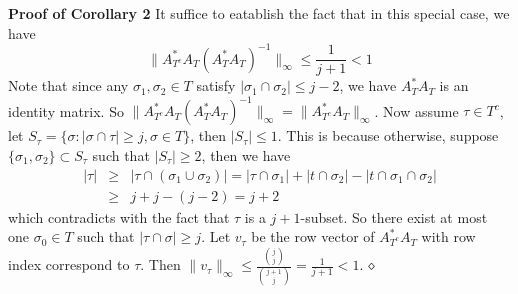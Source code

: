 \documentclass{article}
\begin{document}
\textbf{Proof of Corollary 2} 
It suffice to eatablish the fact that in this special case, we have
$$\|A^*_{T^c}A_T(A^*_TA_T)^{-1}\|_\infty\le \frac{1}{j+1}<1$$
Note that since any $\sigma_1, \sigma_2\in T$ satisfy $|\sigma_1\cap\sigma_2|\le j-2$, 
we have $A^*_TA_T$ is an identity matrix. 
So $\|A^*_{T^c}A_T(A^*_TA_T)^{-1}\|_\infty=\|A^*_{T^c}A_T\|_\infty$. 
Now assume $\tau\in T^c$, let $S_{\tau}=\{\sigma: |\sigma\cap \tau|\ge j, \sigma\in T\}$, 
then $|S_{\tau}|\le 1$. This is because otherwise, suppose 
$\{\sigma_1,\sigma_2\}\subset S_{\tau}$ such that $|S_{\tau}|\ge 2$, then we have
\begin{eqnarray*}
|\tau|&\ge& |\tau\cap (\sigma_1\cup \sigma_2)|=|\tau\cap \sigma_1|+|t\cap \sigma_2|-|t\cap \sigma_1\cap\sigma_2|\\
&\ge & j+j-(j-2)=j+2
\end{eqnarray*}
which contradicts with the fact that $\tau$ is a $j+1$-subset.
So there exist at most one $\sigma_0\in T$ such that $|\tau\cap \sigma|\ge j$. 
Let $v_\tau$ be the row vector of $A^*_{T^c}A_T$ with row index correspond to $\tau$. 
Then $\|v_\tau\|_\infty\le \frac{{j\choose j}}{{j+1\choose j}}=\frac{1}{j+1}<1$. 
$\hfill\diamond$
\end{document}

